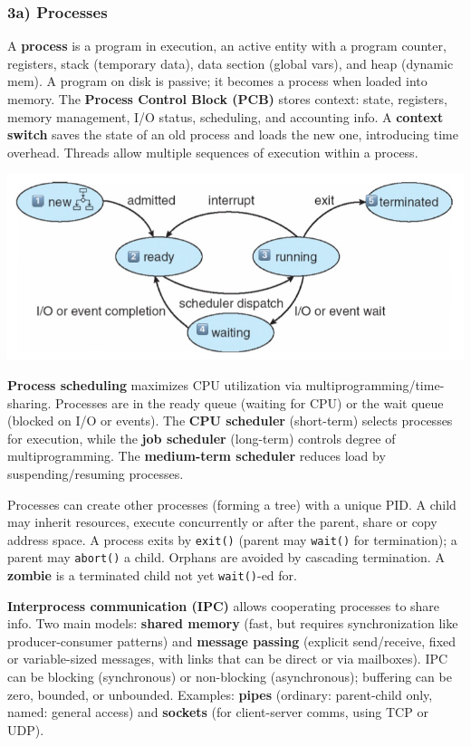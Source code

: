 \subsubsection*{3a) Processes}
A \textbf{process} is a program in execution, an active entity with a program counter, registers, stack (temporary data), data section (global vars), and heap (dynamic mem). A program on disk is passive; it becomes a process when loaded into memory. The \textbf{Process Control Block (PCB)} stores context: state, registers, memory management, I/O status, scheduling, and accounting info. A \textbf{context switch} saves the state of an old process and loads the new one, introducing time overhead. Threads allow multiple sequences of execution within a process.

\includegraphics[width=0.95\linewidth]{images/03a_p09_process_states.png}

\textbf{Process scheduling} maximizes CPU utilization via multiprogramming/time-sharing. Processes are in the ready queue (waiting for CPU) or the wait queue (blocked on I/O or events). The \textbf{CPU scheduler} (short-term) selects processes for execution, while the \textbf{job scheduler} (long-term) controls degree of multiprogramming. The \textbf{medium-term scheduler} reduces load by suspending/resuming processes.

Processes can create other processes (forming a tree) with a unique PID. A child may inherit resources, execute concurrently or after the parent, share or copy address space. A process exits by \texttt{exit()} (parent may \texttt{wait()} for termination); a parent may \texttt{abort()} a child. Orphans are avoided by cascading termination. A \textbf{zombie} is a terminated child not yet \texttt{wait()}-ed for.

\textbf{Interprocess communication (IPC)} allows cooperating processes to share info. Two main models: \textbf{shared memory} (fast, but requires synchronization like producer-consumer patterns) and \textbf{message passing} (explicit send/receive, fixed or variable-sized messages, with links that can be direct or via mailboxes). IPC can be blocking (synchronous) or non-blocking (asynchronous); buffering can be zero, bounded, or unbounded. Examples: \textbf{pipes} (ordinary: parent-child only, named: general access) and \textbf{sockets} (for client-server comms, using TCP or UDP).


